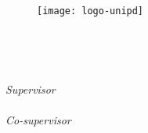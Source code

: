 
\begin{titlepage}

\begin{center}

\begin{LARGE}
\textbf{\myUni}\\
\end{LARGE}

\vspace{10pt}

\begin{Large}
\textsc{\myDepartment}\\
\end{Large}

\vspace{10pt}

\begin{large}
\textsc{\myFaculty}\\
\end{large}

\vspace{30pt}
\begin{figure}[htbp]
\begin{center}
\texttt{[image: logo-unipd]}
\end{center}
\end{figure}
\vspace{30pt} 

\begin{LARGE}
\begin{center}
\textbf{\myTitle}\\
\end{center}
\end{LARGE}

\vspace{10pt} 

\begin{large}
\textsl{\myDegree}\\
\end{large}

\vspace{40pt} 

\begin{large}
\begin{flushleft}
\textit{Supervisor}\\ 
\vspace{5pt} 
\profTitle \myProf \\
\vspace{10pt}
\textit{Co-supervisor}\\
\vspace{5pt} 
\corrTitle \myCorr \\ 
\end{flushleft}


\end{large}
\end{center}
\end{titlepage}
